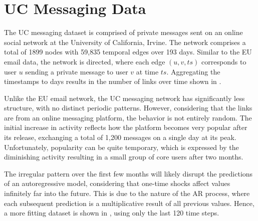\section{UC Messaging Data}

The UC messaging dataset is comprised of private messages sent on an online social network at the University of California, Irvine. The network comprises a total of 1899 nodes with 59,835 temporal edges over 193 days. Similar to the EU email data, the network is directed, where each edge $(u,v,ts)$ corresponds to user $u$ sending a private message to user $v$ at time $ts$. Aggregating the timestamps to days results in the number of links over time shown in .

Unlike the EU email network, the UC messaging network has significantly less structure, with no distinct periodic patterns. However, considering that the links are from an online messaging platform, the behavior is not entirely random. The initial increase in activity reflects how the platform becomes very popular after its release, exchanging a total of 1,200 messages on a single day at its peak. Unfortunately, popularity can be quite temporary, which is expressed by the diminishing activity resulting in a small group of core users after two months.

\xfig{\xdouble
    {\ximg{Data/UCMessaging/Links}[UC Messaging Links]}
    {\ximg{Data/UCMessaging/Links75-195}[Links for {$t=[75,195)$}]}
}

The irregular pattern over the first few months will likely disrupt the predictions of an autoregressive model, considering that one-time shocks affect values infinitely far into the future. This is due to the nature of the AR process, where each subsequent prediction is a multiplicative result of all previous values. Hence, a more fitting dataset is shown in , using only the last 120 time steps.


